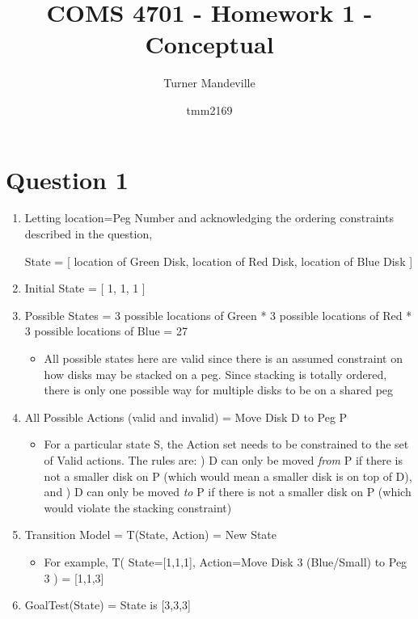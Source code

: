 \documentclass{article}
\title{COMS 4701 - Homework 1 - Conceptual}
\author
{
Turner Mandeville
\and tmm2169
}
\begin{document}
    \maketitle
    \section*{Question 1}
    \begin{enumerate}
        \item Letting location=Peg Number and acknowledging the ordering constraints described in the question, 
        
        State = [ location of Green Disk, location of Red Disk, location of Blue Disk ]
        \item Initial State = [ 1, 1, 1 ]
        \item Possible States = 3 possible locations of Green * 3 possible locations of Red * 3 possible locations of Blue = 27
        \begin{itemize}
          \item All possible states here are valid since there is an assumed constraint on how disks may be stacked on a peg. Since stacking is totally ordered, there is only one possible way for multiple disks to be on a shared peg
        \end{itemize}
        \item All Possible Actions (valid and invalid) = Move Disk D to Peg P
        \begin{itemize}
          \item For a particular state S, the Action set needs to be constrained to the set of Valid actions.
          \newline The rules are:
          \newline
          ) D can only be moved \emph{from} P if there is not a smaller disk on P (which would mean a smaller disk is on top of D), and 
          ) D can only be moved \emph{to} P if there is not a smaller disk on P (which would violate the stacking constraint)
        \end{itemize}
        \item Transition Model = T(State, Action) = New State
        \begin{itemize}
          \item For example, T( State=[1,1,1], Action=Move Disk 3 (Blue/Small) to Peg 3 ) = [1,1,3]
        \end{itemize}
        \item GoalTest(State) = State is [3,3,3]
    \end{enumerate}
\end{document}
